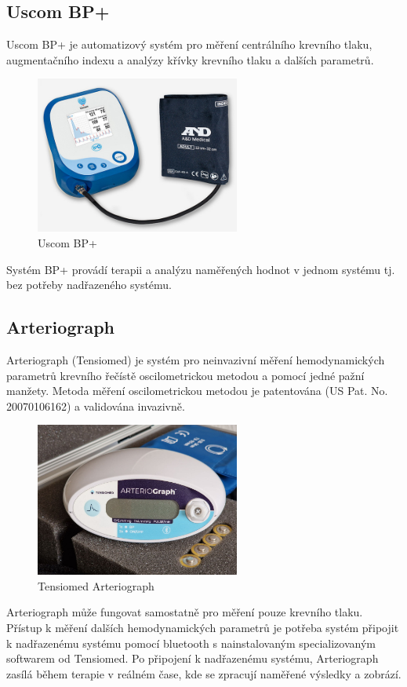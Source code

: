 \subsection{Uscom BP+}
Uscom BP+ je automatizový systém pro měření centrálního krevního tlaku, augmentačního indexu a analýzy křívky krevního tlaku a dalších parametrů.
\begin{figure}[H]
    \caption{Uscom BP+}
    \includegraphics[width=0.6\textwidth]{pictures/uscom_bp.jpg}
\end{figure}
Systém BP+ provádí terapii a analýzu naměřených hodnot v jednom systému tj. bez potřeby nadřazeného systému.

\subsection{Arteriograph}
Arteriograph (Tensiomed) je systém pro neinvazivní měření hemodynamických parametrů krevního řečístě oscilometrickou metodou a pomocí jedné pažní manžety.
Metoda měření oscilometrickou metodou je patentována (US Pat. No. 20070106162) a validována invazivně.
\begin{figure}[H]
    \caption{Tensiomed Arteriograph}
    \includegraphics[width=0.6\textwidth]{pictures/arteriograph.jpg}
\end{figure}
Arteriograph může fungovat samostatně pro měření pouze krevního tlaku. Přístup k měření dalších hemodynamických parametrů je potřeba systém připojit k nadřazenému systému pomocí bluetooth s nainstalovaným specializovaným softwarem od Tensiomed.
Po připojení k nadřazenému systému, Arteriograph zasílá během terapie v reálném čase, kde se zpracují naměřené výsledky a zobrází.